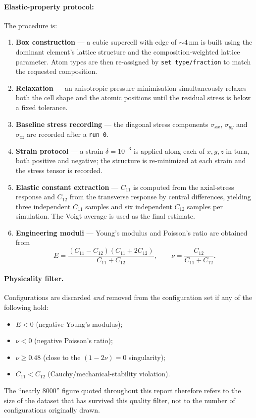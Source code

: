 \paragraph{Elastic-property protocol:}
The procedure is:
\begin{enumerate}
	\item \textbf{Box construction} --- a cubic supercell with edge of
	      $\sim$4\,nm is built using the dominant element's lattice
	      structure and the composition-weighted lattice parameter. Atom
	      types are then re-assigned by \texttt{set type/fraction} to
	      match the requested composition.
	\item \textbf{Relaxation} --- an anisotropic pressure minimisation
	      simultaneously relaxes both the cell shape and the atomic
	      positions until the residual stress is below a fixed
	      tolerance.
	\item \textbf{Baseline stress recording} --- the diagonal stress
	      components $\sigma_{xx}$, $\sigma_{yy}$ and $\sigma_{zz}$ are
	      recorded after a \texttt{run~0}.
	\item \textbf{Strain protocol} --- a strain $\delta=10^{-3}$ is
	      applied along each of $x,y,z$ in turn, both positive and
	      negative; the structure is re-minimized at each strain and the
	      stress tensor is recorded.
	\item \textbf{Elastic constant extraction} --- $C_{11}$ is computed
	      from the axial-stress response and $C_{12}$ from the transverse
	      response by central differences, yielding three independent
	      $C_{11}$ samples and six independent $C_{12}$ samples per
	      simulation. The Voigt average \citep{voigt} is used as the
	      final estimate.
	\item \textbf{Engineering moduli} --- Young's modulus and Poisson's
	      ratio are obtained from
	      \begin{equation}
	      	E = \frac{(C_{11}-C_{12})(C_{11}+2C_{12})}{C_{11}+C_{12}},
	      	\qquad
	      	\nu = \frac{C_{12}}{C_{11}+C_{12}}.
	      	\label{eq:elastic}
	      \end{equation}
\end{enumerate}
\paragraph{Physicality filter.} Configurations are discarded
\emph{and} removed from the configuration set if any of the following
hold:
\begin{itemize}
	\item $E < 0$ (negative Young's modulus);
	\item $\nu < 0$ (negative Poisson's ratio);
	\item $\nu \geq 0.48$ (close to the $(1-2\nu)=0$ singularity);
	\item $C_{11} < C_{12}$ (Cauchy/mechanical-stability violation).
\end{itemize}
The ``nearly 8000'' figure quoted throughout this report therefore
refers to the size of the dataset that has survived this quality
filter, not to the number of configurations originally drawn.

